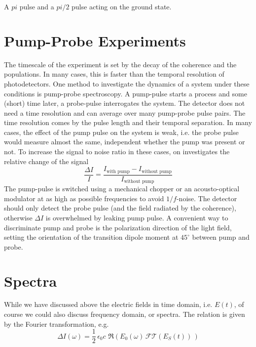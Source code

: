 \begin{marginfigure}
\hspace*{\fill} 

\vspace{5mm}

\hspace*{\fill} 

\caption{A $pi$ pulse and a $pi/2$ pulse acting on the ground state.}
\end{marginfigure}

\section{Pump-Probe Experiments}

The timescale of the experiment is set by the decay of the coherence and the populations. In many cases, this is faster than the temporal resolution of photodetectors. One method to investigate the dynamics of a system under these conditions is pump-probe spectroscopy. A pump-pulse starts a process and some (short) time later, a probe-pulse interrogates the system. The detector does not need a time resolution and can average over many pump-probe pulse pairs. The time resolution comes by the pulse length and their temporal separation. In many cases, the effect of the pump pulse on the system is weak, i.e. the probe pulse would measure almost the same, independent whether the pump was present or not. To increase the signal to noise ratio in these cases, on investigates the relative change of the signal
\begin{equation}
 \frac{\Delta I}{I} = \frac{I_\text{with pump} - I_\text{without pump} }{I_\text{without pump}}
\end{equation}
The pump-pulse is switched using a mechanical chopper or an acousto-optical modulator at as high as possible frequencies to avoid $1/f$-noise. The detector should only detect the probe pulse (and the field radiated by the coherence), otherwise $\Delta I$ is overwhelmed by leaking pump pulse. A convenient way to discriminate pump and probe is the polarization direction of the light field, setting the orientation of the transition dipole moment at $45^\circ$ between pump and probe.



\section{Spectra}

While we have discussed above the electric fields in time domain, i.e. $E(t)$, of course we could also discuss frequency domain, or spectra. The relation is given by the Fourier transformation, e.g.
\begin{equation}
\Delta I (\omega) = \frac{1}{2} \, \epsilon_0 c \, \, \Re \left( E_0(\omega) \, \mathcal{FT} ( E_S(t) ) \, \right)
\end{equation}


\printbibliography[segment=\therefsegment,heading=subbibliography]
